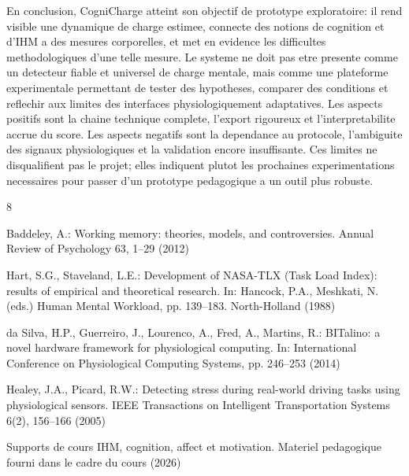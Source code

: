\documentclass[runningheads]{llncs}
\begin{document}
En conclusion, CogniCharge atteint son objectif de prototype exploratoire: il rend visible une dynamique de charge estimee, connecte des notions de cognition et d'IHM a des mesures corporelles, et met en evidence les difficultes methodologiques d'une telle mesure. Le systeme ne doit pas etre presente comme un detecteur fiable et universel de charge mentale, mais comme une plateforme experimentale permettant de tester des hypotheses, comparer des conditions et reflechir aux limites des interfaces physiologiquement adaptatives. Les aspects positifs sont la chaine technique complete, l'export rigoureux et l'interpretabilite accrue du score. Les aspects negatifs sont la dependance au protocole, l'ambiguite des signaux physiologiques et la validation encore insuffisante. Ces limites ne disqualifient pas le projet; elles indiquent plutot les prochaines experimentations necessaires pour passer d'un prototype pedagogique a un outil plus robuste.

\begin{thebibliography}{8}

Baddeley, A.: Working memory: theories, models, and controversies. Annual Review of Psychology 63, 1--29 (2012)

Hart, S.G., Staveland, L.E.: Development of NASA-TLX (Task Load Index): results of empirical and theoretical research. In: Hancock, P.A., Meshkati, N. (eds.) Human Mental Workload, pp. 139--183. North-Holland (1988)

da Silva, H.P., Guerreiro, J., Lourenco, A., Fred, A., Martins, R.: BITalino: a novel hardware framework for physiological computing. In: International Conference on Physiological Computing Systems, pp. 246--253 (2014)

Healey, J.A., Picard, R.W.: Detecting stress during real-world driving tasks using physiological sensors. IEEE Transactions on Intelligent Transportation Systems 6(2), 156--166 (2005)

Supports de cours IHM, cognition, affect et motivation. Materiel pedagogique fourni dans le cadre du cours (2026)

\end{thebibliography}
\end{document}
